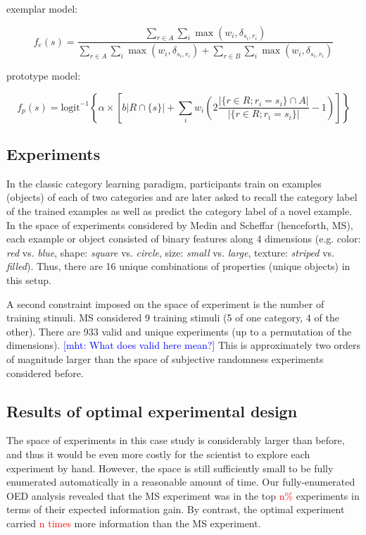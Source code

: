 \documentclass{article}
\newcommand{\red}[1]{\textcolor{Red}{#1}}
\newcommand{\mht}[1]{\textcolor{Blue}{[mht: #1]}}
\newcommand{\cas}[1]{ \textsf{\color{darkgray} \scriptsize #1} }
\begin{document}
exemplar model:

$$ f_e(s) = \frac{ \sum\limits_{r \in A}{\sum\limits_{i}\max (w_i, \delta_{s_i, r_i})} }{
  \sum\limits_{r \in A}{\sum\limits_{i}\max (w_i, \delta_{s_i, r_i} )} + \sum\limits_{r \in B}{\sum\limits_{i}\max (w_i, \delta_{s_i, r_i})}
} $$

prototype model:

$$ f_p(s) = \mathrm{logit}^{-1}\left\{ \alpha \times \left[ b|R \cap \{s\}| + \sum\limits_{i}w_i \left(2\frac{|\{r \in R ; r_i = s_i \} \cap A |}{|\{r \in R ; r_i = s_i \}|} - 1\right) \right] \right\} $$


\subsection{Experiments}

In the classic category learning paradigm, participants train on examples (objects) of each of two categories and are later asked to recall the category label of the trained examples as well as predict the category label of a novel example.
In the space of experiments considered by Medin and Scheffar (henceforth, MS), each example or object consisted of binary features along 4 dimensions (e.g. color: \emph{red} vs. \emph{blue}, shape: \emph{square} vs. \emph{circle}, size: \emph{small} vs. \emph{large}, texture: \emph{striped} vs. \emph{filled}).
Thus, there are 16 unique combinations of properties (unique objects) in this setup.

A second constraint imposed on the space of experiment is the number of training stimuli. MS considered 9 training stimuli (5 of one category, 4 of the other).
There are 933 valid and unique experiments (up to a permutation of the dimensions).
\mht{What does valid here mean?}
This is approximately two orders of magnitude larger than the space of subjective randomness experiments considered before.




\subsection{Results of optimal experimental design}

The space of experiments in this case study is considerably larger than before, and thus it would be even more costly for the scientist to explore each experiment by hand. However, the space is still sufficiently small to be fully enumerated automatically in a reasonable amount of time.
Our fully-enumerated OED analysis revealed that the MS experiment was in the top \red{n\%} experiments in terms of their expected information gain.
By contrast, the optimal experiment carried \red{n times} more information than the MS experiment.
\end{document}
